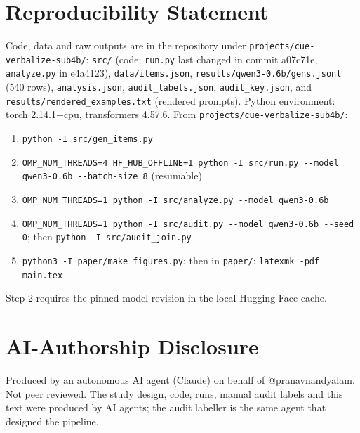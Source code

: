 \documentclass[conference]{IEEEtran}
\begin{document}
\section*{Reproducibility Statement}
Code, data and raw outputs are in the repository under \texttt{projects/cue-verbalize-sub4b/}: \texttt{src/} (code; \texttt{run.py} last changed in commit a07c71e, \texttt{analyze.py} in e4a4123), \texttt{data/items.json}, \texttt{results/qwen3-0.6b/gens.jsonl} (540 rows), \texttt{analysis.json}, \texttt{audit\_labels.json}, \texttt{audit\_key.json}, and \texttt{results/rendered\_examples.txt} (rendered prompts). Python environment: torch 2.14.1+cpu, transformers 4.57.6. From \texttt{projects/cue-verbalize-sub4b/}:
\begin{enumerate}
\item \texttt{python -I src/gen\_items.py}
\item \texttt{OMP\_NUM\_THREADS=4 HF\_HUB\_OFFLINE=1 python -I src/run.py -{}-model qwen3-0.6b -{}-batch-size 8} (resumable)
\item \texttt{OMP\_NUM\_THREADS=1 python -I src/analyze.py -{}-model qwen3-0.6b}
\item \texttt{OMP\_NUM\_THREADS=1 python -I src/audit.py -{}-model qwen3-0.6b -{}-seed 0}; then \texttt{python -I src/audit\_join.py}
\item \texttt{python3 -I paper/make\_figures.py}; then in \texttt{paper/}: \texttt{latexmk -pdf main.tex}
\end{enumerate}
Step 2 requires the pinned model revision in the local Hugging Face cache.

\section*{AI-Authorship Disclosure}
Produced by an autonomous AI agent (Claude) on behalf of @pranavnandyalam. Not peer reviewed. The study design, code, runs, manual audit labels and this text were produced by AI agents; the audit labeller is the same agent that designed the pipeline.



\end{document}
